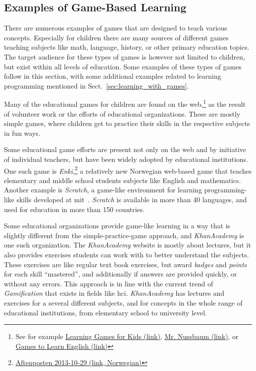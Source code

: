 \subsection{Examples of Game-Based Learning}
\label{sec:game_based_learning_examples}
There are numerous examples of games that are designed to teach various concepts. Especially for children there are many sources of different games teaching subjects like math, language, history, or other primary education topics. The target audience for these types of games is however not limited to children, but exist within all levels of education. Some examples of these types of games follow in this section, with some additional examples related to learning programming mentioned in Sect.~\ref{sec:learning_with_games}.

\noindent
Many of the educational games for children are found on the web,\footnote{See for example \href{http://www.learninggamesforkids.com/}{Learning Games for Kids (link)}, \href{http://mrnussbaum.com/gamescode/}{Mr. Nussbaum (link)}, or \href{http://gamestolearnenglish.com/}{Games to Learn English (link)}} as the result of volunteer work or the efforts of educational organizations. These are mostly simple games, where children get to practice their skills in the respective subjects in fun ways.

\noindent
Some educational game efforts are present not only on the web and by initiative of individual teachers, but have been widely adopted by educational institutions. One such game is \emph{Enki},\footnote{\href{http://www.aftenposten.no/nyheter/iriks/Her-larer-11-aringene-matte-7351857.html}{Aftenposten 2013-10-29 (link, Norwegian)}} a relatively new Norwegian web-based game that teaches elementary and middle school students subjects like English and mathematics. Another example is \emph{Scratch}, a game-like environment for learning programming-like skills developed at \gls{mit}~\cite{resnick:scratch}. \emph{Scratch} is available in more than 40 languages, and used for education in more than 150 countries.

\noindent
Some educational organizations provide game-like learning in a way that is slightly different from the simple-practice-game approach, and \emph{KhanAcademy} is one such organization. The \emph{KhanAcademy} website is mostly about lectures, but it also provides exercises students can work with to better understand the subjects. These exercises are like regular text book exercises, but award \emph{badges} and \emph{points} for each skill ``mastered'', and additionally if answers are provided quickly, or without any errors. This approach is in line with the current trend of \emph{Gamification} that exists in fields like \gls{hci}\cite{deterding:gamification}. \emph{KhanAcademy} has lectures and exercises for a several different subjects, and for concepts in the whole range of educational institutions, from elementary school to university level.

